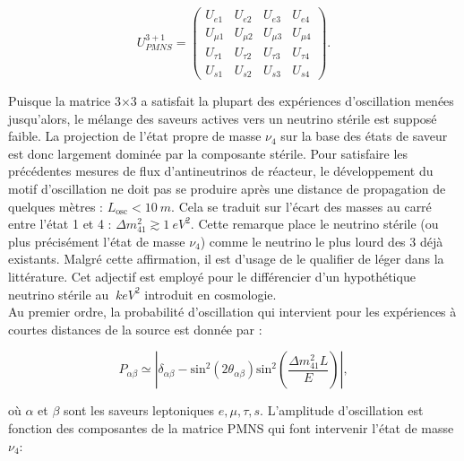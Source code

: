 \begin{equation}
    U_{PMNS}^{3+1} = \left(\begin{matrix}
        U_{e1} & U_{e2} & U_{e3} & U_{e4}\\
        U_{\mu 1} & U_{\mu 2} & U_{\mu 3} & U_{\mu 4} \\
        U_{\tau 1} & U_{\tau 2} & U_{\tau 3} & U_{\tau 4}\\
        U_{s1} & U_{s2} & U_{s3} & U_{s4}
    \end{matrix}\right).
\end{equation}

\bigbreak


Puisque la matrice 3$\times$3 a satisfait la plupart des expériences d'oscillation menées jusqu'alors, le mélange des saveurs actives vers un neutrino stérile est supposé faible. La projection de l'état propre de masse $\nu_4$ sur la base des états de saveur est donc largement dominée par la composante stérile. Pour satisfaire les précédentes mesures de flux d'antineutrinos de réacteur, le développement du motif d'oscillation ne doit pas se produire après une distance de propagation de quelques mètres : $L_\textrm{osc} < \SI{10}{m}$. Cela se traduit sur l'écart des masses au carré entre l'état 1 et 4 : $\Delta m^2_{41} \gtrsim \SI{1}{eV^2}$. Cette remarque place le neutrino stérile (ou plus précisément l'état de masse $\nu_4$) comme le neutrino le plus lourd des 3 déjà existants. Malgré cette affirmation, il est d'usage de le qualifier de \og léger \fg{} dans la littérature. Cet adjectif est employé pour le différencier d'un hypothétique neutrino stérile au $\SI{}{keV^2}$ introduit en cosmologie.\\

Au premier ordre, la probabilité d'oscillation qui intervient pour les expériences à courtes distances de la source est donnée par :

\begin{equation}
    P_{\alpha\beta} \simeq \left|\delta_{\alpha\beta} - \textrm{sin}^2\left(2\theta_{\alpha\beta}\right) \textrm{sin}^2\left(\frac{\Delta m^2_{41}L}{E}  \right)\right|,
\end{equation}

où $\alpha$ et $\beta$ sont les saveurs leptoniques $e,\mu,\tau,s$. L'amplitude d'oscillation est fonction des composantes de la matrice PMNS qui font intervenir l'état de masse $\nu_4$:

